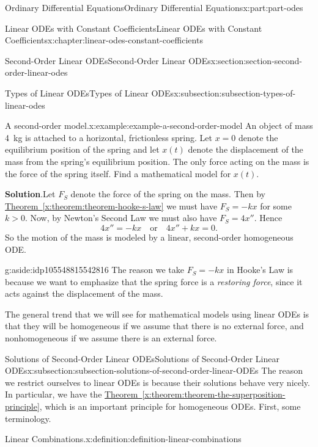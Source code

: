 \documentclass[twoside,10pt,]{book}
\newcommand{\blocktitlefont}{\relax}
\newcommand{\xreffont}{\relax}
\numberwithin{equation}{part}
\begin{document}
\begin{partptx}{Ordinary Differential Equations}{}{Ordinary Differential Equations}{}{}{x:part:part-odes}
\begin{chapterptx}{Linear ODEs with Constant Coefficients}{}{Linear ODEs with Constant Coefficients}{}{}{x:chapter:linear-odes-constant-coefficients}
\begin{sectionptx}{Second-Order Linear ODEs}{}{Second-Order Linear ODEs}{}{}{x:section:section-second-order-linear-odes}
\begin{subsectionptx}{Types of Linear ODEs}{}{Types of Linear ODEs}{}{}{x:subsection:subsection-types-of-linear-odes}
\begin{example}{A second-order model.}{x:example:example-a-second-order-model}
An object of mass \SI{4}{\kilo\gram} is attached to a horizontal, frictionless spring. Let \(x=0\) denote the equilibrium position of the spring and let \(x(t)\) denote the displacement of the mass from the spring's equilibrium position. The only force acting on the mass is the force of the spring itself. Find a mathematical model for \(x(t)\).%
\par\smallskip%
\noindent\textbf{\blocktitlefont Solution}.\hypertarget{g:solution:idp105548815540000}{}\quad{}Let \(F_{S}\) denote the force of the spring on the mass. Then by \hyperref[x:theorem:theorem-hooke-s-law]{Theorem~{\xreffont\ref{x:theorem:theorem-hooke-s-law}}} we must have \(F_{S} = -kx\) for some \(k>0\). Now, by Newton's Second Law we must also have \(F_{S} = 4x''\). Hence%
\begin{equation*}
4x'' = -kx\quad\text{or}\quad4x''+kx = 0.
\end{equation*}
So the motion of the mass is modeled by a linear, second-order homogeneous ODE.%
\end{example}
\begin{aside}{}{g:aside:idp105548815542816}%
The reason we take \(F_{S} = -kx\) in Hooke's Law is because we want to emphasize that the spring force is a \emph{restoring force}, since it acts against the displacement of the mass.%
\end{aside}
The general trend that we will see for mathematical models using linear ODEs is that they will be homogeneous if we assume that there is no external force, and nonhomogeneous if we assume there is an external force.%
\end{subsectionptx}
%
%
\typeout{************************************************}
\typeout{************************************************}
%
\begin{subsectionptx}{Solutions of Second-Order Linear ODEs}{}{Solutions of Second-Order Linear ODEs}{}{}{x:subsection:subsection-solutions-of-second-order-linear-ODEs}
The reason we restrict ourselves to linear ODEs is because their solutions behave very nicely. In particular, we have the \hyperref[x:theorem:theorem-the-superposition-principle]{Theorem~{\xreffont\ref{x:theorem:theorem-the-superposition-principle}}}, which is an important principle for homogeneous ODEs. First, some terminology.%
\begin{definition}{Linear Combinations.}{x:definition:definition-linear-combinations}%
%

\end{definition}
\end{subsectionptx}
\end{sectionptx}
\end{chapterptx}
\end{partptx}
\end{document}
